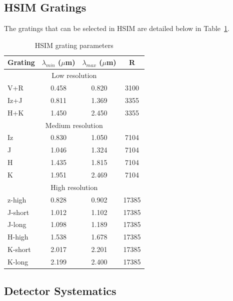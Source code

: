 \documentclass[12pt]{report}
\begin{document}
\subsection{HSIM Gratings}

The gratings that can be selected in HSIM are detailed below in Table~\ref{tab:gratings}.
\begin{table}[h]
\centering
\caption{HSIM grating parameters}
\label{tab:gratings}
\begin{tabular}{lccc}
\hline
Grating & $\lambda_{min}$ ($\mu$m) & $\lambda_{max}$ ($\mu$m) & R \\
\hline
\multicolumn{4}{c}{Low resolution}\\
\hline
V+R & 0.458 & 0.820 & 3100 \\
Iz+J & 0.811 & 1.369 & 3355 \\
H+K & 1.450 & 2.450 & 3355 \\
\hline
\multicolumn{4}{c}{Medium resolution}\\
\hline
Iz & 0.830 & 1.050 & 7104 \\
J & 1.046 & 1.324 & 7104 \\
H & 1.435 & 1.815 & 7104 \\
K & 1.951 & 2.469 & 7104\\
\hline
\multicolumn{4}{c}{High resolution}\\
\hline
z-high & 0.828 & 0.902 & 17385 \\
J-short & 1.012 & 1.102 & 17385 \\
J-long & 1.098 & 1.189 & 17385 \\
H-high & 1.538 & 1.678 & 17385 \\
K-short & 2.017 & 2.201 & 17385 \\
K-long & 2.199 & 2.400 & 17385 \\
\hline
\end{tabular}
\end{table}

\subsection{Detector Systematics}
\end{document}
